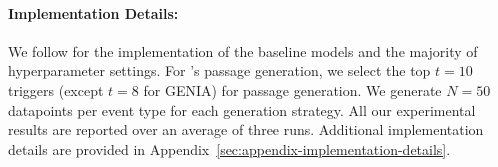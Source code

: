 \paragraph{Implementation Details:}
We follow \starName{} for the implementation of the baseline models and the majority of hyperparameter settings.
For \modelName's passage generation, we select the top $t=10$ triggers (except $t=8$ for GENIA) for passage generation.
We generate $N=50$ datapoints per event type for each generation strategy.
All our experimental results are reported over an average of three runs.
Additional implementation details are provided in Appendix~\ref{sec:appendix-implementation-details}.
